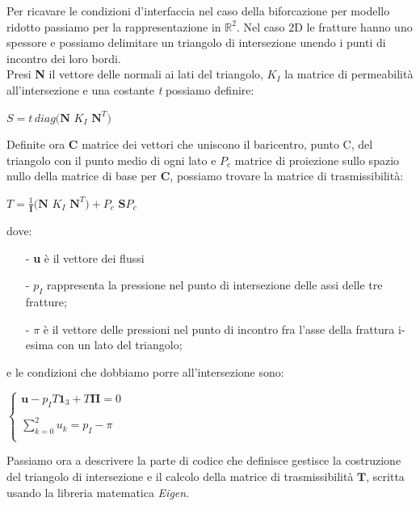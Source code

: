 Per ricavare le condizioni d'interfaccia nel caso della biforcazione per modello ridotto passiamo per la rappresentazione in $\mathbb{R}^{2}$.
Nel caso 2D le fratture hanno uno spessore e possiamo delimitare un triangolo di intersezione unendo i punti di incontro dei loro bordi. \\
Presi \textbf{N} il vettore delle normali ai lati del triangolo, \textbf{$K_{I}$} la matrice di permeabilit\`{a} all'intersezione e una costante \textit{t} possiamo definire:
\begin{center}
	$ S = \textit{t} \, diag( \textbf{N}$ \textbf{$K_{I}$} $ \textbf{N}^{T} ) $
\end{center}
Definite ora \textbf{C} matrice dei vettori che uniscono il baricentro, punto C, del triangolo con il punto medio  di ogni lato e \textbf{$P_{c}$} matrice di proiezione sullo spazio nullo della matrice di base per \textbf{C}, possiamo trovare la matrice di trasmissibilit\`{a}:
\begin{center}
	$ T = \frac{1}{\textbf{I}}( \textbf{N}$ \textbf{$K_{I}$} $ \textbf{N}^{T} ) + $\textbf{$P_{c}$} $\textbf{S}$\textbf{$P_{c}$}
\end{center}
dove:
	\begin{enumerate}
	\item[-] \textbf{u} è il  vettore dei flussi
	\item[-] $p_{I}$ rappresenta la  pressione nel punto di intersezione delle assi delle tre fratture;
	\item[-] \textbf{$\pi$} è il vettore delle pressioni nel punto di incontro fra l'asse della frattura i-esima con un lato del triangolo;
	\end{enumerate} 
e le condizioni che dobbiamo porre all'intersezione sono:
\begin{center}			
	$\left \{
		\begin{array}{l}	
	 		\textbf{u} - p_{I}T\textbf{1}_{3}+T \boldsymbol{\Pi}=0  \\ \\
     	 	\displaystyle \sum_{k=0}^2 u_{k} = p_{I} - \pi  \\
		\end{array}
	\right.$
\end{center} \label{condizioni d'interfaccia}

\par Passiamo ora a descrivere la parte di codice che definisce gestisce la costruzione del triangolo di intersezione e il calcolo della matrice di trasmissibilità $\textbf{T}$, scritta usando la libreria matematica \textit{Eigen}.\\

